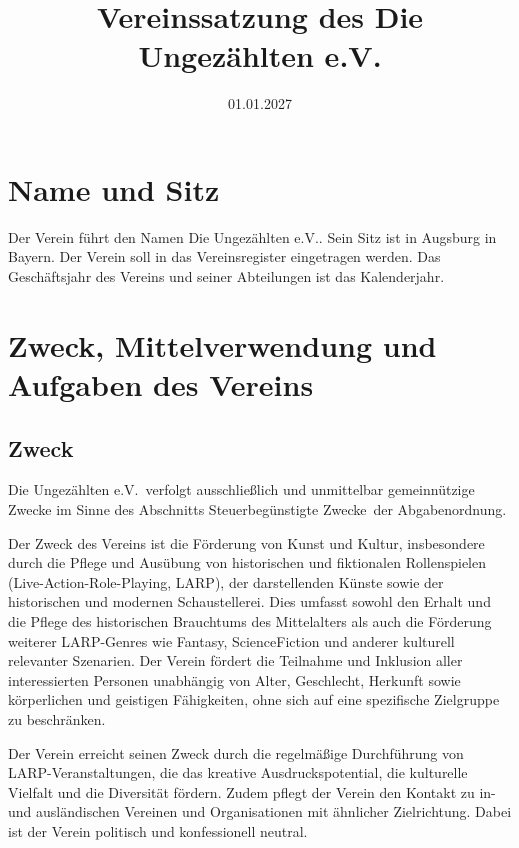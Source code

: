 \documentclass[10pt,a4paper]{article}
\title{Vereinssatzung des \glqq Die Ungezählten e.V.\grqq}
\date{01.01.2027}
\begin{document}
\maketitle

\section{Name und Sitz}
Der Verein führt den Namen \glqq Die Ungezählten e.V.\grqq.
Sein Sitz ist in Augsburg in Bayern.
Der Verein soll in das Vereinsregister eingetragen werden.
Das Geschäftsjahr des Vereins und seiner Abteilungen ist das Kalenderjahr.

\section{Zweck, Mittelverwendung und Aufgaben des Vereins}\label{zweck}

\subsection{Zweck}
\glqq Die Ungezählten e.V.\grqq\,
verfolgt ausschließlich und unmittelbar gemeinnützige Zwecke im Sinne des Abschnitts
\glqq Steuerbegünstigte Zwecke\grqq\, der Abgabenordnung.


Der Zweck des Vereins ist die Förderung von Kunst und Kultur,
insbesondere durch die Pflege und Ausübung
von historischen und fiktionalen Rollenspielen (Live-Action-Role-Playing, LARP), der darstellenden Künste
sowie der historischen und modernen Schaustellerei. Dies umfasst sowohl den Erhalt und die Pflege des
historischen Brauchtums des Mittelalters als auch die Förderung weiterer LARP-Genres wie Fantasy,
ScienceFiction und anderer kulturell relevanter Szenarien. Der Verein fördert die Teilnahme und Inklusion aller
interessierten Personen unabhängig von Alter, Geschlecht, Herkunft sowie körperlichen und geistigen
Fähigkeiten, ohne sich auf eine spezifische Zielgruppe zu beschränken.

Der Verein erreicht seinen Zweck durch die regelmäßige Durchführung von LARP-Veranstaltungen,
die das kreative Ausdruckspotential, die kulturelle Vielfalt und die Diversität fördern. 
Zudem pflegt der Verein den Kontakt zu in- und ausländischen Vereinen und Organisationen mit ähnlicher Zielrichtung.
Dabei ist der Verein politisch und konfessionell neutral.
\end{document}
